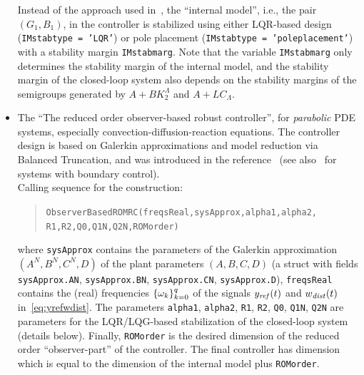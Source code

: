 \documentclass[11pt, a4paper]{amsart}
\newcommand{\CL}{C_\Lambda}
\theoremstyle{definition}
\numberwithin{equation}{section}
\newcommand{\yref}{y_{\mbox{\scriptsize\textit{ref}}}}
\newcommand{\wdist}{w_{\mbox{\scriptsize\textit{dist}}}}
\begin{document}
\begin{itemize}
     Instead of the approach used in~\cite{Pau16a}, the ``internal model'', i.e., the pair $(G_1,B_1)$, in the controller is stabilized using either LQR-based design (\texttt{IMstabtype = 'LQR'}) or pole placement (\texttt{IMstabtype = 'poleplacement'}) with a stability margin \texttt{IMstabmarg}. Note that the variable \texttt{IMstabmarg} only determines the stability margin of the internal model, and the stability margin of the closed-loop system also depends on the stability margins of the semigroups generated by $A+BK_2^\Lambda$ and $A+L\CL$.
     
     \bigskip
     
\item 
The ``The reduced order observer-based robust controller'', for \emph{parabolic} PDE systems, especially convection-diffusion-reaction equations. The controller design is based on Galerkin approximations and model reduction via Balanced Truncation, and was introduced in the reference~\cite{PauPha20} (see also~\cite{PhaPau21} for systems with boundary control).\\[1ex]
      Calling sequence for the construction:\\[-1ex]
     \begin{quotation}
       \hspace{-1cm}\texttt{ObserverBasedROMRC(freqsReal,sysApprox,alpha1,alpha2,\\ 
	 \phantom{a}\hspace{3.0cm} R1,R2,Q0,Q1N,Q2N,ROMorder)}
     \end{quotation}
     \medskip
     where \texttt{sysApprox} contains the parameters of the Galerkin approximation $(A^N,B^N,C^N,D)$ of the plant parameters $(A,B,C,D)$ (a struct with fields \texttt{sysApprox.AN}, \texttt{sysApprox.BN}, \texttt{sysApprox.CN}, \texttt{sysApprox.D}), \texttt{freqsReal} contains the (real) frequencies $\{\omega_k\}_{k=0}^q$ of the signals $\yref(t)$ and $\wdist(t)$ in~\eqref{eq:yrefwdist}.
The parameters \texttt{alpha1}, \texttt{alpha2},
\texttt{R1}, \texttt{R2}, \texttt{Q0}, \texttt{Q1N}, \texttt{Q2N} are parameters for the LQR/LQG-based stabilization of the closed-loop system (details below). Finally, \texttt{ROMorder} is the desired dimension of the reduced order ``observer-part'' of the controller. The final controller has dimension which is equal to the dimension of the internal model plus \texttt{ROMorder}.


\end{itemize}
\end{document}
